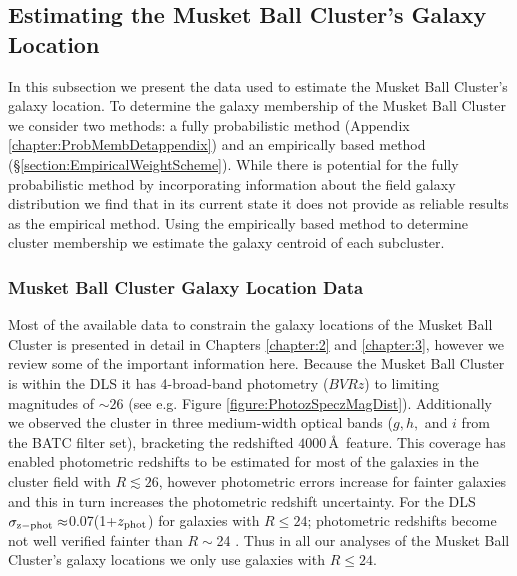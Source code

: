 \subsection{Estimating the Musket Ball Cluster's Galaxy Location}

In this subsection we present the data used to estimate the Musket Ball Cluster's galaxy location.
To determine the galaxy membership of the Musket Ball Cluster we consider two methods: a fully probabilistic method (Appendix \ref{chapter:ProbMembDetappendix}) and an empirically based method (\S\ref{section:EmpiricalWeightScheme}).
While there is potential for the fully probabilistic method by incorporating information about the field galaxy distribution we find that in its current state it does not provide as reliable results as the empirical method.
Using the empirically based method to determine cluster membership we estimate the galaxy centroid of each subcluster.

\subsubsection{Musket Ball Cluster Galaxy Location Data}

Most of the available data to constrain the galaxy locations of the Musket Ball Cluster is presented in detail in Chapters \ref{chapter:2} and \ref{chapter:3}, however we review some of the important information here.
Because the Musket Ball Cluster is within the DLS \citep{Wittman:2002cp} it has 4-broad-band photometry ($BVRz$) to limiting magnitudes of $\sim26$ (see e.g. Figure \ref{figure:PhotozSpeczMagDist}).
Additionally we observed the cluster in three medium-width optical bands ($g,h,$ and $i$ from the BATC filter set), bracketing the redshifted $4000$\,\AA\, feature.
This coverage has enabled photometric redshifts to be estimated for most of the galaxies in the cluster field with $R\lesssim26$, however photometric errors increase for fainter galaxies and this in turn increases the photometric redshift uncertainty.  
For the DLS $\sigma_{\rm z-phot}\approx$0.07(1+$z_{\rm phot}$) for galaxies with $R\leq24$; photometric redshifts become not well verified fainter than $R\sim$24 \citep{Schmidt:2013ig}.
Thus in all our analyses of the Musket Ball Cluster's galaxy locations we only use galaxies with $R\leq24$.

